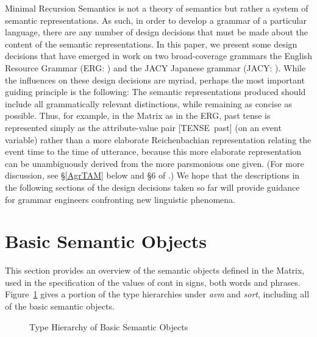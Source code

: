 \documentclass[12pt]{article}
\begin{document}
Minimal Recursion Semantics is not a theory of semantics but rather a
system of semantic representations.  As such, in order to develop a
grammar of a particular language, there are any number of design
decisions that must be made about the content of the semantic
representations.  In this paper, we present some design decisions that
have emerged in work on two broad-coverage grammars the English
Resource Grammar (ERG: ) and the JACY Japanese
grammar (JACY: ).
While the influences on these design decisions
are myriad, perhaps the most important guiding principle is the
following: The semantic representations produced should include all
grammatically relevant distinctions, while remaining as concise as
possible.  Thus, for example, in the Matrix as in the ERG, past tense
is represented simply as the attribute-value pair \mbox{[TENSE past]}
(on an event variable) rather than a more elaborate Reichenbachian
representation relating the event time to the time of utterance,
because this more elaborate representation can be unambiguously
derived from the more parsmonious one given.  (For more discussion,
see \S\ref{AgrTAM} below and {\S}6 of .)
We hope that the descriptions in the following sections of the design
decisions taken so far will provide guidance for grammar engineers
confronting new linguistic phenomena.

\section{Basic Semantic Objects}
\label{basicobj}

This section provides an overview of the semantic objects defined in the
Matrix, used in the specification of the values of {\sc cont} in signs, both
words and phrases.  Figure~\ref{mrsobj} gives a portion of the type hierarchies
under {\it avm} and {\it sort}, including all of the basic semantic objects.

\begin{figure}[ht]
\begin{center}
{\it\small
\begin{tree}
\end{tree}
}
\end{center}
\caption{Type Hierarchy of Basic Semantic Objects}
\label{mrsobj}
\end{figure}
\end{document}
